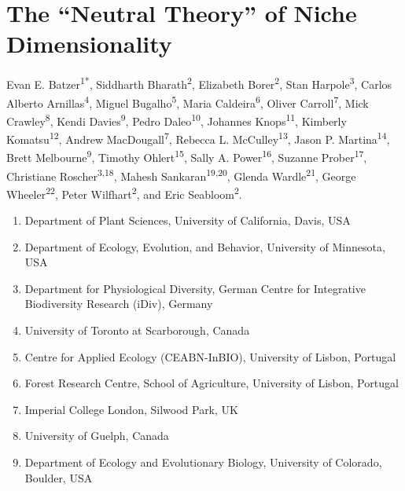 \documentclass[twoside,12pt,final]{ucthesis-CA2012}
\providecommand{\tightlist}{%
  \setlength{\itemsep}{0pt}\setlength{\parskip}{0pt}}
\begin{document}
\begin{ucmainmatter}

\hypertarget{the-neutral-theory-of-niche-dimensionality}{%
\chapter{The ``Neutral Theory'' of Niche Dimensionality}\label{the-neutral-theory-of-niche-dimensionality}}


Evan E. Batzer\textsuperscript{1*},
Siddharth Bharath\textsuperscript{2},
Elizabeth Borer\textsuperscript{2},
Stan Harpole\textsuperscript{3},
Carlos Alberto Arnillas\textsuperscript{4},
Miguel Bugalho\textsuperscript{5},
Maria Caldeira\textsuperscript{6},
Oliver Carroll\textsuperscript{7},
Mick Crawley\textsuperscript{8},
Kendi Davies\textsuperscript{9},
Pedro Daleo\textsuperscript{10},
Johannes Knops\textsuperscript{11},
Kimberly Komatsu\textsuperscript{12},
Andrew MacDougall\textsuperscript{7},
Rebecca L. McCulley\textsuperscript{13},
Jason P. Martina\textsuperscript{14},
Brett Melbourne\textsuperscript{9},
Timothy Ohlert\textsuperscript{15},
Sally A. Power\textsuperscript{16},
Suzanne Prober\textsuperscript{17},
Christiane Roscher\textsuperscript{3,18},
Mahesh Sankaran\textsuperscript{19,20},
Glenda Wardle\textsuperscript{21},
George Wheeler\textsuperscript{22},
Peter Wilfhart\textsuperscript{2},
and Eric Seabloom\textsuperscript{2}.
\begin{enumerate}
\def\labelenumi{\arabic{enumi}.}
\tightlist
\item
  Department of Plant Sciences, University of California, Davis, USA
\item
  Department of Ecology, Evolution, and Behavior, University of Minnesota, USA
\item
  Department for Physiological Diversity, German Centre for Integrative Biodiversity Research (iDiv), Germany
\item
  University of Toronto at Scarborough, Canada
\item
  Centre for Applied Ecology (CEABN-InBIO), University of Lisbon, Portugal
\item
  Forest Research Centre, School of Agriculture, University of Lisbon, Portugal
\item
  Imperial College London, Silwood Park, UK
\item
  University of Guelph, Canada
\item
  Department of Ecology and Evolutionary Biology, University of Colorado, Boulder, USA

\end{enumerate}
\end{ucmainmatter}
\end{document}
